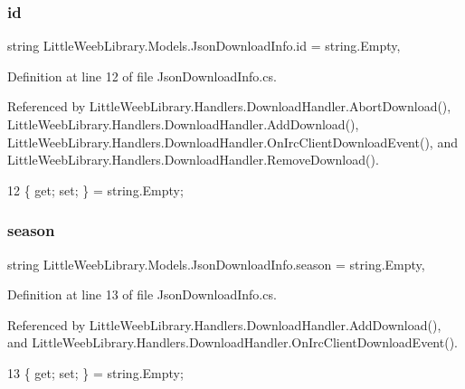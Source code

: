 \subsubsection{\texorpdfstring{id}{id}}
{\footnotesize\ttfamily string Little\+Weeb\+Library.\+Models.\+Json\+Download\+Info.\+id = string.\+Empty\hspace{0.3cm}{\ttfamily [get]}, {\ttfamily [set]}}



Definition at line 12 of file Json\+Download\+Info.\+cs.



Referenced by Little\+Weeb\+Library.\+Handlers.\+Download\+Handler.\+Abort\+Download(), Little\+Weeb\+Library.\+Handlers.\+Download\+Handler.\+Add\+Download(), Little\+Weeb\+Library.\+Handlers.\+Download\+Handler.\+On\+Irc\+Client\+Download\+Event(), and Little\+Weeb\+Library.\+Handlers.\+Download\+Handler.\+Remove\+Download().


\begin{DoxyCode}
12 \{ \textcolor{keyword}{get}; \textcolor{keyword}{set}; \} = \textcolor{keywordtype}{string}.Empty;
\end{DoxyCode}
\mbox{\label{class_little_weeb_library_1_1_models_1_1_json_download_info_a1a534e3df34b7537f0a00a0ace920ee8}} 
\subsubsection{\texorpdfstring{season}{season}}
{\footnotesize\ttfamily string Little\+Weeb\+Library.\+Models.\+Json\+Download\+Info.\+season = string.\+Empty\hspace{0.3cm}{\ttfamily [get]}, {\ttfamily [set]}}



Definition at line 13 of file Json\+Download\+Info.\+cs.



Referenced by Little\+Weeb\+Library.\+Handlers.\+Download\+Handler.\+Add\+Download(), and Little\+Weeb\+Library.\+Handlers.\+Download\+Handler.\+On\+Irc\+Client\+Download\+Event().


\begin{DoxyCode}
13 \{ \textcolor{keyword}{get}; \textcolor{keyword}{set}; \} = \textcolor{keywordtype}{string}.Empty;
\end{DoxyCode}
\mbox{\label{class_little_weeb_library_1_1_models_1_1_json_download_info_a8ea2c1b9bb90ff75af38c6afa8f0bc14}} 
